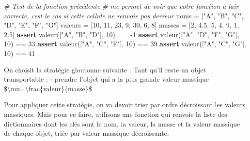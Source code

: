 \documentclass[
  paper=a4,
  ,captions=tableheading
]{scrartcl}
\newenvironment{Shaded}{}{}
\newcommand{\CommentTok}[1]{\textcolor[rgb]{0.38,0.63,0.69}{\textit{#1}}}
\newcommand{\ControlFlowTok}[1]{\textcolor[rgb]{0.00,0.44,0.13}{\textbf{#1}}}
\newcommand{\DecValTok}[1]{\textcolor[rgb]{0.25,0.63,0.44}{#1}}
\newcommand{\FloatTok}[1]{\textcolor[rgb]{0.25,0.63,0.44}{#1}}
\newcommand{\NormalTok}[1]{#1}
\newcommand{\OperatorTok}[1]{\textcolor[rgb]{0.40,0.40,0.40}{#1}}
\newcommand{\StringTok}[1]{\textcolor[rgb]{0.25,0.44,0.63}{#1}}
\begin{document}
\begin{Shaded}
\begin{Highlighting}[]
\CommentTok{\# Test de la fonction précédente}
\CommentTok{\# me permet de voir que votre fonction à l\textquotesingle{}air correcte, c\textquotesingle{}est le cas si cette cellule ne renvoie pas d\textquotesingle{}erreur}
\NormalTok{noms }\OperatorTok{=}\NormalTok{ [}\StringTok{"A"}\NormalTok{, }\StringTok{"B"}\NormalTok{, }\StringTok{"C"}\NormalTok{, }\StringTok{"D"}\NormalTok{, }\StringTok{"E"}\NormalTok{, }\StringTok{"F"}\NormalTok{, }\StringTok{"G"}\NormalTok{]}
\NormalTok{valeurs }\OperatorTok{=}\NormalTok{ [}\DecValTok{10}\NormalTok{, }\DecValTok{11}\NormalTok{, }\DecValTok{23}\NormalTok{, }\DecValTok{9}\NormalTok{, }\DecValTok{30}\NormalTok{, }\DecValTok{6}\NormalTok{, }\DecValTok{8}\NormalTok{]}
\NormalTok{masses }\OperatorTok{=}\NormalTok{ [}\DecValTok{2}\NormalTok{, }\FloatTok{4.5}\NormalTok{, }\DecValTok{5}\NormalTok{, }\DecValTok{4}\NormalTok{, }\DecValTok{9}\NormalTok{, }\DecValTok{1}\NormalTok{, }\FloatTok{2.5}\NormalTok{]}
\ControlFlowTok{assert}\NormalTok{ valeur([}\StringTok{"A"}\NormalTok{, }\StringTok{"B"}\NormalTok{, }\StringTok{"D"}\NormalTok{], }\DecValTok{10}\NormalTok{) }\OperatorTok{==} \OperatorTok{{-}}\DecValTok{1}
\ControlFlowTok{assert}\NormalTok{ valeur([}\StringTok{"A"}\NormalTok{, }\StringTok{"D"}\NormalTok{, }\StringTok{"F"}\NormalTok{, }\StringTok{"G"}\NormalTok{], }\DecValTok{10}\NormalTok{) }\OperatorTok{==} \DecValTok{33}
\ControlFlowTok{assert}\NormalTok{ valeur([}\StringTok{"A"}\NormalTok{, }\StringTok{"C"}\NormalTok{, }\StringTok{"F"}\NormalTok{], }\DecValTok{10}\NormalTok{) }\OperatorTok{==} \DecValTok{39}
\ControlFlowTok{assert}\NormalTok{ valeur([}\StringTok{"A"}\NormalTok{, }\StringTok{"C"}\NormalTok{, }\StringTok{"G"}\NormalTok{], }\DecValTok{10}\NormalTok{) }\OperatorTok{==} \DecValTok{41}
\end{Highlighting}
\end{Shaded}

On choisit la stratégie gloutonne suivante : Tant qu'il reste un objet
transportable : - prendre l'objet qui a la plus grande valeur massique
\$\textbackslash mu=\textbackslash frac\{valeur\}\{masse\}\$

Pour appliquer cette stratégie, on va devoir trier par ordre décroissant
les valeurs massiques. Mais pour ce faire, utilisons une fonction qui
renvoie la liste des dictionnaires dont les clés sont le nom, la valeur,
la masse et la valeur massique de chaque objet, triée par valeur
massique décroissante.
\end{document}
